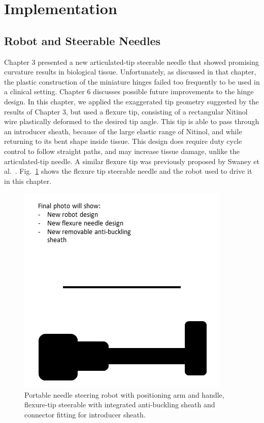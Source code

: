 \section{Implementation}
\label{sec:HumanInTheLoopImplementation}

\subsection{Robot and Steerable Needles}
\label{sec:NS2RobotAndNeedle}
Chapter 3 presented a new articulated-tip steerable needle that showed promising curvature results in biological tissue. Unfortunately, as discussed in that chapter, the plastic construction of the miniature hinges failed too frequently to be used in a clinical setting. Chapter 6 discusses possible future improvements to the hinge design. In this chapter, we applied the exaggerated tip geometry suggested by the results of Chapter 3, but used a flexure tip, consisting of a rectangular Nitinol wire plastically deformed to the desired tip angle. This tip is able to pass through an introducer sheath, because of the large elastic range of Nitinol, and while returning to its bent shape inside tissue. This design does require duty cycle control to follow straight paths, and may increase tissue damage, unlike the articulated-tip needle. A similar flexure tip was previously proposed by Swaney et al.~\cite{Swaney2013}. Fig.~\ref{fig:NS2AndNeedle} shows the flexure tip steerable needle and the robot used to drive it in this chapter.

\begin{figure}[!ht]
\centering
\includegraphics[width = 0.4\columnwidth]{./Images/Chapter5/NS2RobotAndNeedle/DRAFTNS2RobotAndNeedle.jpg}%
\caption[Robot and flexure-tip steerable needles]{Portable needle steering robot with positioning arm and handle, flexure-tip steerable with integrated anti-buckling sheath and connector fitting for introducer sheath.}
\label{fig:NS2AndNeedle}
\end{figure}  

